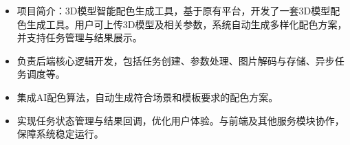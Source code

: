 \documentclass{resume}
\begin{document}
\begin{onehalfspacing}




\end{onehalfspacing}

\begin{onehalfspacing}
\begin{itemize}
  \item 项目简介：3D模型智能配色生成工具，基于原有平台，开发了一套3D模型配色生成工具。用户可上传3D模型及相关参数，系统自动生成多样化配色方案，并支持任务管理与结果展示。
  \item 负责后端核心逻辑开发，包括任务创建、参数处理、图片解码与存储、异步任务调度等。
  \item 集成AI配色算法，自动生成符合场景和模板要求的配色方案。
  \item 实现任务状态管理与结果回调，优化用户体验。与前端及其他服务模块协作，保障系统稳定运行。 
\end{itemize}
\end{onehalfspacing}
\end{document}
